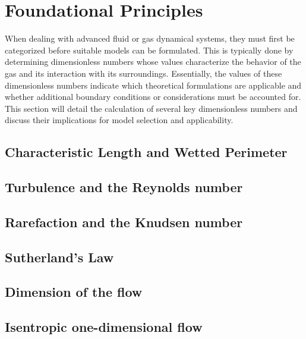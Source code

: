 \section{Foundational Principles}
	When dealing with advanced fluid or gas dynamical systems, they must first be categorized before suitable models can be formulated.
	This is typically done by determining dimensionless numbers whose values characterize the behavior of the gas and its interaction with its surroundings.
	Essentially, the values of these dimensionless numbers indicate which theoretical formulations are applicable and whether additional boundary conditions or considerations must be accounted for.
	This section will detail the calculation of several key dimensionless numbers and discuss their implications for model selection and applicability.

\subsection{Characteristic Length and Wetted Perimeter}\label{sec:characteristic-length}


\subsection{Turbulence and the Reynolds number}\label{sec:reynolds_foundations}


\subsection{Rarefaction and the Knudsen number}\label{sec:knudsen_foundations}


\subsection{Sutherland's Law}


\subsection{Dimension of the flow}\label{sec:flow-dimension-foundations}


\subsection{Isentropic one-dimensional flow}\label{sec:isentropic-1D-foundations}


